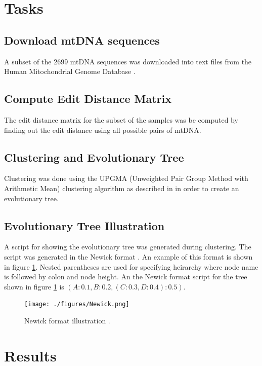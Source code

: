 \documentclass[conference]{IEEEtran}
\begin{document}
\section{Tasks}

\subsection{Download mtDNA sequences}
A subset of the 2699 mtDNA sequences was downloaded into text files from the Human Mitochondrial Genome Database \cite{mtDnaDatabase}.

\subsection{Compute Edit Distance Matrix}

The edit distance matrix for the subset of the samples was be computed by finding out the edit distance using all possible pairs of mtDNA. 

\subsection{Clustering and Evolutionary Tree}
Clustering was done using the UPGMA (Unweighted Pair Group Method with Arithmetic Mean) clustering algorithm as described in \cite{TextBook1} in order to create an evolutionary tree.

\subsection{Evolutionary Tree Illustration}
A script for showing the evolutionary tree was generated during clustering. The script was generated in the Newick format \cite{Newick}. An example of this format is shown in figure \ref{NewickFormat}. Nested parentheses are used for specifying heirarchy where node name is followed by colon and node height. An the Newick format script for the tree shown in figure \ref{NewickFormat} is $(A:0.1,B:0.2,(C:0.3,D:0.4):0.5)$.


\begin{figure}[!t]
\centering
\texttt{[image: ./figures/Newick.png]}
\caption{Newick format illustration \cite{Newick} .}
\label{NewickFormat}
\end{figure}

\FloatBarrier
\section{Results}
\end{document}
